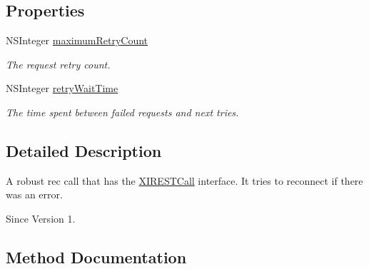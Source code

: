 \subsection*{Properties}
\begin{DoxyCompactItemize}
\item 
N\+S\+Integer \hyperlink{interface_x_i_robust_r_e_s_t_call_a171520ea20c4754022319faa183c9a1c}{maximum\+Retry\+Count}
\begin{DoxyCompactList}\small\item\em The request retry count. \end{DoxyCompactList}\item 
N\+S\+Integer \hyperlink{interface_x_i_robust_r_e_s_t_call_aaf805da47865acca300f8fd2e6823d61}{retry\+Wait\+Time}
\begin{DoxyCompactList}\small\item\em The time spent between failed requests and next tries. \end{DoxyCompactList}\end{DoxyCompactItemize}


\subsection{Detailed Description}
A robust rec call that has the \hyperlink{class_x_i_r_e_s_t_call-p}{X\+I\+R\+E\+S\+T\+Call} interface. It tries to reconnect if there was an error. 

\begin{DoxySince}{Since}
Version 1. 
\end{DoxySince}


\subsection{Method Documentation}
\hypertarget{interface_x_i_robust_r_e_s_t_call_af138b45a25978ef766bd3fe602cbffec}{}\label{interface_x_i_robust_r_e_s_t_call_af138b45a25978ef766bd3fe602cbffec} 
